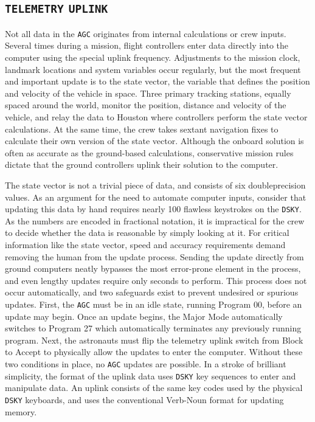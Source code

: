 \documentclass[refcap, oxford]{ahsan}
\begin{document}
\subsection{\texttt{TELEMETRY} \texttt{UPLINK}}
Not all data in the \texttt{AGC} originates from internal calculations or crew inputs. Several times during a mission, flight controllers enter data directly into the computer using the special uplink frequency. Adjustments to the mission clock, landmark locations and system variables occur regularly, but the most frequent and important update is to the state vector, the variable that defines the position and velocity of the vehicle in space. Three primary tracking stations, equally spaced around the world, monitor the position, distance and velocity of the vehicle, and relay the data to Houston where controllers perform the state vector calculations. At the same time, the crew takes sextant navigation fixes to calculate their own version of the state vector. Although the onboard solution is often as accurate as the ground-based calculations, conservative mission rules dictate that the ground controllers uplink their solution to the computer.

The state vector is not a trivial piece of data, and consists of six doubleprecision values. As an argument for the need to automate computer inputs, consider that updating this data by hand requires nearly 100 flawless keystrokes on the \texttt{DSKY}. As the numbers are encoded in fractional notation, it is impractical for the crew to decide whether the data is reasonable by simply looking at it. For critical information like the state vector, speed and accuracy requirements demand removing the human from the update process. Sending the update directly from ground computers neatly bypasses the most error-prone element in the process, and even lengthy updates require only seconds to perform. This process does not occur automatically, and two safeguards exist to prevent undesired or spurious updates. First, the \texttt{AGC} must be in an idle state, running Program 00, before an update may begin. Once an update begins, the Major Mode automatically switches to Program 27 which automatically terminates any previously running program. Next, the astronauts must flip the telemetry uplink switch from Block to Accept to physically allow the updates to enter the computer. Without these two conditions in place, no \texttt{AGC} updates are possible. In a stroke of brilliant simplicity, the format of the uplink data uses \texttt{DSKY} key sequences to enter and manipulate data. An uplink consists of the same key codes used by the physical \texttt{DSKY} keyboards, and uses the conventional Verb-Noun format for updating memory.
\end{document}
